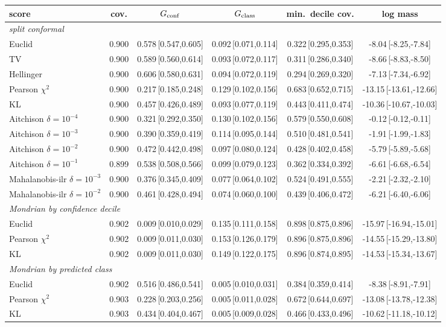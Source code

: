 \begin{tabular}{lccccc}\toprule
score & cov. & $G_{\rm conf}$ & $G_{\rm class}$ & min.\ decile cov. & log mass\\\midrule
\multicolumn{6}{l}{\emph{split conformal}}\\
Euclid & 0.900 & 0.578\,[0.547,0.605] & 0.092\,[0.071,0.114] & 0.322\,[0.295,0.353] & -8.04\,[-8.25,-7.84]\\
TV & 0.900 & 0.589\,[0.560,0.614] & 0.093\,[0.072,0.117] & 0.311\,[0.286,0.340] & -8.66\,[-8.83,-8.50]\\
Hellinger & 0.900 & 0.606\,[0.580,0.631] & 0.094\,[0.072,0.119] & 0.294\,[0.269,0.320] & -7.13\,[-7.34,-6.92]\\
Pearson $\chi^2$ & 0.900 & 0.217\,[0.185,0.248] & 0.129\,[0.102,0.156] & 0.683\,[0.652,0.715] & -13.15\,[-13.61,-12.66]\\
KL & 0.900 & 0.457\,[0.426,0.489] & 0.093\,[0.077,0.119] & 0.443\,[0.411,0.474] & -10.36\,[-10.67,-10.03]\\
Aitchison $\delta{=}10^{-4}$ & 0.900 & 0.321\,[0.292,0.350] & 0.130\,[0.102,0.156] & 0.579\,[0.550,0.608] & -0.12\,[-0.12,-0.11]\\
Aitchison $\delta{=}10^{-3}$ & 0.900 & 0.390\,[0.359,0.419] & 0.114\,[0.095,0.144] & 0.510\,[0.481,0.541] & -1.91\,[-1.99,-1.83]\\
Aitchison $\delta{=}10^{-2}$ & 0.900 & 0.472\,[0.442,0.498] & 0.097\,[0.080,0.124] & 0.428\,[0.402,0.458] & -5.79\,[-5.89,-5.68]\\
Aitchison $\delta{=}10^{-1}$ & 0.899 & 0.538\,[0.508,0.566] & 0.099\,[0.079,0.123] & 0.362\,[0.334,0.392] & -6.61\,[-6.68,-6.54]\\
Mahalanobis-ilr $\delta{=}10^{-3}$ & 0.900 & 0.376\,[0.345,0.409] & 0.077\,[0.064,0.102] & 0.524\,[0.491,0.555] & -2.21\,[-2.32,-2.10]\\
Mahalanobis-ilr $\delta{=}10^{-2}$ & 0.900 & 0.461\,[0.428,0.494] & 0.074\,[0.060,0.100] & 0.439\,[0.406,0.472] & -6.21\,[-6.40,-6.06]\\
\multicolumn{6}{l}{\emph{Mondrian by confidence decile}}\\
Euclid & 0.902 & 0.009\,[0.010,0.029] & 0.135\,[0.111,0.158] & 0.898\,[0.875,0.896] & -15.97\,[-16.94,-15.01]\\
Pearson $\chi^2$ & 0.902 & 0.009\,[0.011,0.030] & 0.153\,[0.126,0.179] & 0.896\,[0.875,0.896] & -14.55\,[-15.29,-13.80]\\
KL & 0.902 & 0.009\,[0.011,0.030] & 0.149\,[0.122,0.175] & 0.896\,[0.874,0.895] & -14.53\,[-15.34,-13.67]\\
\multicolumn{6}{l}{\emph{Mondrian by predicted class}}\\
Euclid & 0.902 & 0.516\,[0.486,0.541] & 0.005\,[0.010,0.031] & 0.384\,[0.359,0.414] & -8.38\,[-8.91,-7.91]\\
Pearson $\chi^2$ & 0.903 & 0.228\,[0.203,0.256] & 0.005\,[0.011,0.028] & 0.672\,[0.644,0.697] & -13.08\,[-13.78,-12.38]\\
KL & 0.903 & 0.434\,[0.404,0.467] & 0.005\,[0.009,0.028] & 0.466\,[0.433,0.496] & -10.62\,[-11.18,-10.12]\\
\bottomrule\end{tabular}
